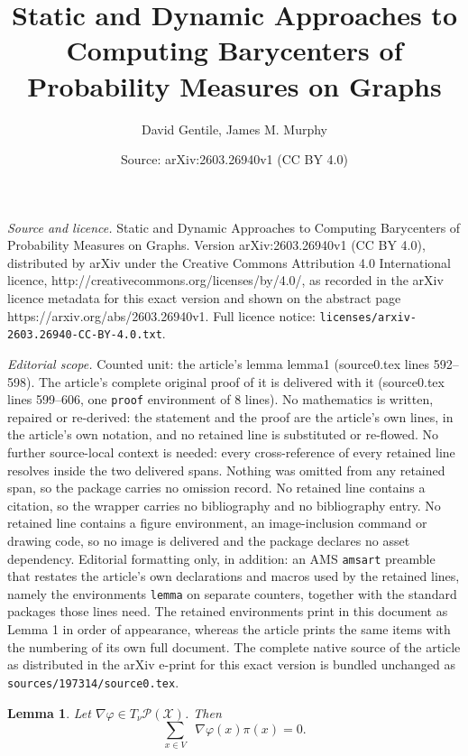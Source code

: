 \documentclass[10pt,a4paper]{amsart}
\title{Static and Dynamic Approaches to Computing Barycenters of Probability Measures on Graphs}
\author{David Gentile, James M. Murphy}
\date{Source: arXiv:2603.26940v1 (CC BY 4.0)}
\newtheorem{lemma}{Lemma}
\newcommand{\X}{\mathcal{X}}
\DeclareMathOperator*{\divx}{div_{\X}}
\begin{document}
\maketitle

\noindent\emph{Source and licence.} Static and Dynamic Approaches to Computing Barycenters of Probability Measures on Graphs. Version arXiv:2603.26940v1 (CC BY 4.0), distributed by arXiv under the Creative Commons Attribution 4.0 International licence, http://creativecommons.org/licenses/by/4.0/, as recorded in the arXiv licence metadata for this exact version and shown on the abstract page https://arxiv.org/abs/2603.26940v1. Full licence notice: \texttt{licenses/arxiv-2603.26940-CC-BY-4.0.txt}.\par\smallskip

\noindent\textit{Editorial scope.} Counted unit: the article's lemma lemma1 (source0.tex lines 592--598). The article's complete original proof of it is delivered with it (source0.tex lines 599--606, one \texttt{proof} environment of 8 lines). No mathematics is written, repaired or re-derived: the statement and the proof are the article's own lines, in the article's own notation, and no retained line is substituted or re-flowed.  No further source-local context is needed: every cross-reference of every retained line resolves inside the two delivered spans.  Nothing was omitted from any retained span, so the package carries no omission record.  No retained line contains a citation, so the wrapper carries no bibliography and no bibliography entry.  No retained line contains a figure environment, an image-inclusion command or drawing code, so no image is delivered and the package declares no asset dependency.  Editorial formatting only, in addition: an AMS \texttt{amsart} preamble that restates the article's own declarations and macros used by the retained lines, namely the environments \texttt{lemma} on separate counters, together with the standard packages those lines need.  The retained environments print in this document as Lemma 1 in order of appearance, whereas the article prints the same items with the numbering of its own full document.  The complete native source of the article as distributed in the arXiv e-print for this exact version is bundled unchanged as \texttt{sources/197314/source0.tex}.
\begin{lemma}
\label{lemma1}
Let \(\nabla\varphi \in T_{\nu}\mathcal{P}(\X)\). Then 
\begin{equation*}
\sum\limits_{x \in V}\divx \nabla\varphi(x)\pi(x) = 0.
\end{equation*}
\end{lemma}
\end{document}

